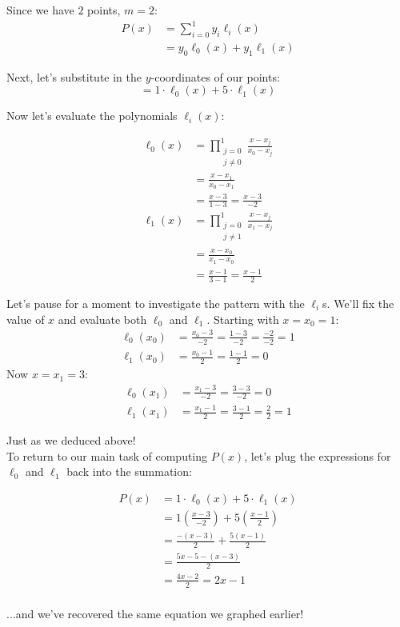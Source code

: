 \begin{example}
Since we have $2$ points, $m=2$:
\begin{align*}
    P(x) &= \sum_{i=0}^{1} y_i \ell_i(x)\\
    &= y_0 \ell_0(x) + y_1 \ell_1(x)
\end{align*}

Next, let's substitute in the $y$-coordinates of our points:
\[
    = 1 \cdot \ell_0(x) + 5 \cdot \ell_1(x)
\]

Now let's evaluate the polynomials $\ell_i(x)$:

\begin{align*}
    \ell_0(x) &= \prod_{\substack{j=0\\j\neq 0}}^{1} \frac{x-x_j}{x_0-x_j}\\
    &= \frac{x-x_1}{x_0-x_1}\\
    &= \frac{x-3}{1-3}
    = \frac{x-3}{-2}\\
    \ell_1(x) &= \prod_{\substack{j=0\\j\neq 1}}^{1} \frac{x-x_j}{x_1-x_j}\\
    &= \frac{x-x_0}{x_1-x_0}\\
    &= \frac{x-1}{3-1}
    = \frac{x-1}{2}
\end{align*}

Let's pause for a moment to investigate the pattern with the $\ell_i$s. 
We'll fix the value of $x$ and evaluate both $\ell_0$ and $\ell_1$. Starting 
with $x=x_0=1$:
\begin{align*}
    \ell_0(x_0) &= \frac{x_0-3}{-2} = \frac{1-3}{-2} = \frac{-2}{-2} = 1\\
    \ell_1(x_0) &= \frac{x_0-1}{2} = \frac{1-1}{2} = 0
\end{align*}
Now $x=x_1=3$:
\begin{align*}
    \ell_0(x_1) &= \frac{x_1-3}{-2} = \frac{3-3}{-2} = 0\\
    \ell_1(x_1) &= \frac{x_1-1}{2} = \frac{3-1}{2} = \frac{2}{2} = 1
\end{align*}

Just as we deduced above! 
\hfill\\

To return to our main task of computing $P(x)$, let's plug the expressions 
for $\ell_0$ and $\ell_1$ back into the summation:

\begin{align*}
    P(x) &= 1 \cdot \ell_0(x) + 5 \cdot \ell_1(x)\\
    &= 1 \left(\frac{x-3}{-2}\right) + 5 \left(\frac{x-1}{2}\right)\\
    &= \frac{-(x-3)}{2} + \frac{5(x-1)}{2}\\
    &= \frac{5x-5-(x-3)}{2}\\
    &= \frac{4x-2}{2}
    = 2x-1\\
\end{align*}

...and we've recovered the same equation we graphed earlier!
\end{example}

